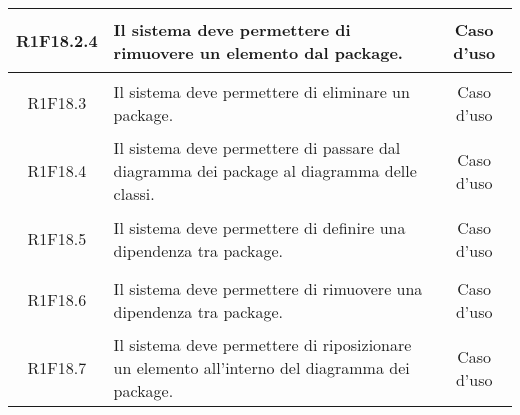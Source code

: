\documentclass[../AnalisiDeiRequisiti.tex]{subfiles}
\begin{document}
\begin{longtable}{|c|>{\centering}p{7cm}|c|}
\hypertarget{R1F18.2.4}{R1F18.2.4} & Il sistema deve permettere di rimuovere un elemento dal package. & Caso d'uso \\ \hline
\hypertarget{R1F18.3}{R1F18.3} & Il sistema deve permettere di eliminare un package. & Caso d'uso \\ \hline
\hypertarget{R1F18.4}{R1F18.4} & Il sistema deve permettere di passare dal diagramma dei package al diagramma delle classi. & Caso d'uso \\ \hline
\hypertarget{R1F18.5}{R1F18.5} & Il sistema deve permettere di definire una dipendenza tra package. & Caso d'uso \\ \hline
\hypertarget{R1F18.6}{R1F18.6} & Il sistema deve permettere di rimuovere una dipendenza tra package. & Caso d'uso \\ \hline
\hypertarget{R1F18.7}{R1F18.7} & Il sistema deve permettere di riposizionare un elemento all'interno del diagramma dei package. & Caso d'uso \\ \hline

\end{longtable}
\end{document}
